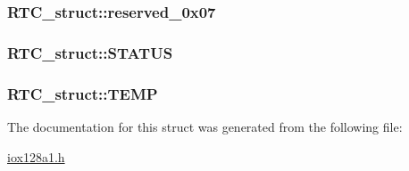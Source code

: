 \label{struct_r_t_c__struct_a1def5d5fd2c1ebddc880750092f75fd6}
\hypertarget{struct_r_t_c__struct_a615de80f154a3326eb22e41597a5838a}{
\subsubsection[{reserved\_\-0x07}]{ {\bf RTC\_\-struct::reserved\_\-0x07}}}
\label{struct_r_t_c__struct_a615de80f154a3326eb22e41597a5838a}
\hypertarget{struct_r_t_c__struct_a30d6c28d300ad2f470d767a76974a1b8}{
\subsubsection[{STATUS}]{ {\bf RTC\_\-struct::STATUS}}}
\label{struct_r_t_c__struct_a30d6c28d300ad2f470d767a76974a1b8}
\hypertarget{struct_r_t_c__struct_a3cf47639ce38cccf25deaefb1b988050}{
\subsubsection[{TEMP}]{ {\bf RTC\_\-struct::TEMP}}}
\label{struct_r_t_c__struct_a3cf47639ce38cccf25deaefb1b988050}


The documentation for this struct was generated from the following file:\begin{DoxyCompactItemize}
\item 
\hyperlink{iox128a1_8h}{iox128a1.h}\end{DoxyCompactItemize}
